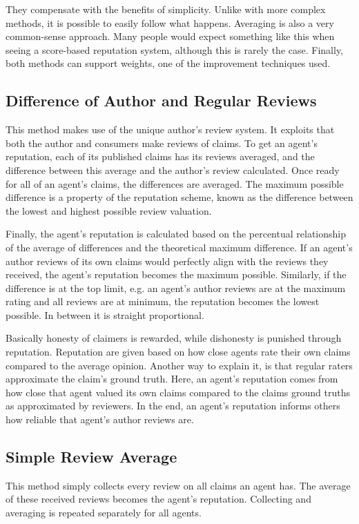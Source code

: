 \documentclass[%
    ]{\PathToTumTemplate/thesis/tum_thesis}
\begin{document}
They compensate with the benefits of simplicity.
Unlike with more complex methods, it is possible to easily follow what happens.
Averaging is also a very common-sense approach.
Many people would expect something like this when seeing a score-based reputation system, although this is rarely the case.
Finally, both methods can support weights, one of the improvement techniques used.

\subsection{Difference of Author and Regular Reviews}
This method makes use of the unique author's review system.
It exploits that both the author and consumers make reviews of claims.
To get an agent's reputation, each of its published claims has its reviews averaged, and the difference between this average and the author's review calculated.
Once ready for all of an agent's claims, the differences are averaged.
The maximum possible difference is a property of the reputation scheme, known as the difference between the lowest and highest possible review valuation.

Finally, the agent's reputation is calculated based on the percentual relationship of the average of differences and the theoretical maximum difference.
If an agent's author reviews of its own claims would perfectly align with the reviews they received, the agent's reputation becomes the maximum possible.
Similarly, if the difference is at the top limit, e.g. an agent's author reviews are at the maximum rating and all reviews are at minimum, the reputation becomes the lowest possible.
In between it is straight proportional.

Basically honesty of claimers is rewarded, while dishonesty is punished through reputation.
Reputation are given based on how close agents rate their own claims compared to the average opinion.
Another way to explain it, is that regular raters approximate the claim's ground truth.
Here, an agent's reputation comes from how close that agent valued its own claims compared to the claims ground truths as approximated by reviewers.
In the end, an agent's reputation informs others how reliable that agent's author reviews are.


\subsection{Simple Review Average}
This method simply collects every review on all claims an agent has.
The average of these received reviews becomes the agent's reputation.
Collecting and averaging is repeated separately for all agents.
\end{document}
